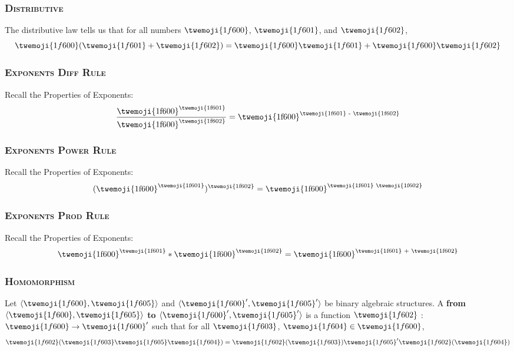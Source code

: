 \documentclass{article}
\begin{document}
\subsubsection{\textsc{Distributive}}
The distributive law tells us that for all numbers $\twemoji{1f600}$, $\twemoji{1f601}$, and $\twemoji{1f602}$,\begin{equation*}\twemoji{1f600}(\twemoji{1f601}+\twemoji{1f602}) = \twemoji{1f600}\twemoji{1f601} + \twemoji{1f600}\twemoji{1f602}
\end{equation*}
\subsubsection{\textsc{Exponents Diff Rule}}
Recall the Properties of Exponents:\begin{equation*}\frac{\text{\twemoji{1f600}}^{\text{\twemoji{1f601}}}}{\text{\twemoji{1f600}}^{\text{\twemoji{1f602}}}} = \text{\twemoji{1f600}}^{\text{\twemoji{1f601} - \twemoji{1f602}}}
\end{equation*}
\subsubsection{\textsc{Exponents Power Rule}}
Recall the Properties of Exponents:\begin{equation*}(\text{\twemoji{1f600}}^{\text{\twemoji{1f601}}})^{\text{\twemoji{1f602}}} = \text{\twemoji{1f600}}^{\text{\twemoji{1f601} \twemoji{1f602}}}
\end{equation*}
\subsubsection{\textsc{Exponents Prod Rule}}
Recall the Properties of Exponents:\begin{equation*}\text{\twemoji{1f600}}^{\text{\twemoji{1f601}}} * \text{\twemoji{1f600}}^{\text{\twemoji{1f602}}} = \text{\twemoji{1f600}}^{\text{\twemoji{1f601} + \twemoji{1f602}}}
\end{equation*}
\subsubsection{\textsc{Homomorphism}}
Let $\langle \twemoji{1f600},\twemoji{1f605}\rangle$ and $\langle \twemoji{1f600}',\twemoji{1f605}'\rangle$ be binary algebraic structures. A \textbf{ from $\langle \twemoji{1f600},\twemoji{1f605}\rangle$ to $\langle \twemoji{1f600}',\twemoji{1f605}'\rangle$} is a function $\twemoji{1f602}$ : $\twemoji{1f600}\rightarrow \twemoji{1f600}'$ such that for all $\twemoji{1f603}$, $\twemoji{1f604}\in \twemoji{1f600}$,\begin{equation*}\twemoji{1f602}(\twemoji{1f603}\twemoji{1f605} \twemoji{1f604}) = \twemoji{1f602}(\twemoji{1f603}) \twemoji{1f605}'\twemoji{1f602}(\twemoji{1f604})
\end{equation*}
\end{document}
